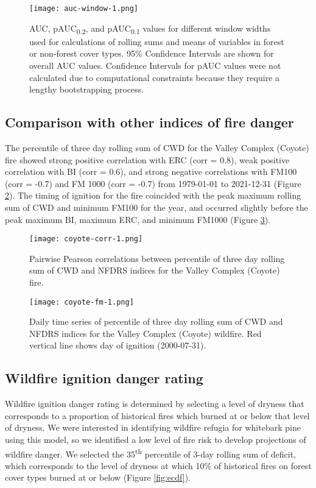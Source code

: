 \documentclass[11p]{article}
\newcommand{\pauc}[1]{pAUC\textsubscript{#1}}
\begin{document}
\begin{figure}[htbp]
  \centering
  \texttt{[image: auc-window-1.png]}
  \caption{AUC, \pauc{0.2}, and \pauc{0.1} values for different window widths used for calculations of rolling sums and means of variables in forest or non-forest cover types. 95\% Confidence Intervals are shown for overall AUC values. Confidence Intervals for pAUC values were not calculated due to computational constraints because they require a lengthy bootstrapping process.}
  \label{fig:auc_window}
\end{figure}

\subsection{Comparison with other indices of fire danger}

The percentile of three day rolling sum of CWD for the Valley Complex (Coyote) fire showed strong positive correlation with ERC (corr = 0.8), weak positive correlation with BI (corr = 0.6), and strong negative correlations with FM100 (corr = -0.7) and FM 1000 (corr = -0.7) from 1979-01-01 to 2021-12-31 (Figure \ref{fig:coyote-corrplot}). The timing of ignition for the fire coincided with the peak maximum rolling sum of CWD and minimum FM100 for the year, and occurred slightly before the peak maximum BI, maximum ERC, and minimum FM1000 (Figure \ref{fig:coyote-fm}).

\begin{figure}[htbp]
  \centering
  \texttt{[image: coyote-corr-1.png]}
  \caption{Pairwise Pearson correlations between percentile of three day rolling sum of CWD and NFDRS indices for the Valley Complex (Coyote) fire.}
  \label{fig:coyote-corrplot}
\end{figure}


\begin{figure}[htbp]
  \centering
  \texttt{[image: coyote-fm-1.png]}
  \caption{Daily time series of percentile of three day rolling sum of CWD and NFDRS indices for the Valley Complex (Coyote) wildfire. Red vertical line shows day of ignition (2000-07-31).}
  \label{fig:coyote-fm}
\end{figure}

\subsection{Wildfire ignition danger rating}

Wildfire ignition danger rating is determined by selecting a level of dryness that corresponds to a proportion of historical fires which burned at or below that level of dryness. We were interested in identifying wildfire refugia for whitebark pine using this model, so we identified a low level of fire risk to develop projections of wildfire danger. We selected the 35\textsuperscript{th} percentile of 3-day rolling sum of deficit, which corresponds to the level of dryness at which 10\% of historical fires on forest cover types burned at or below (Figure \ref{fig:ecdf}).
\end{document}
